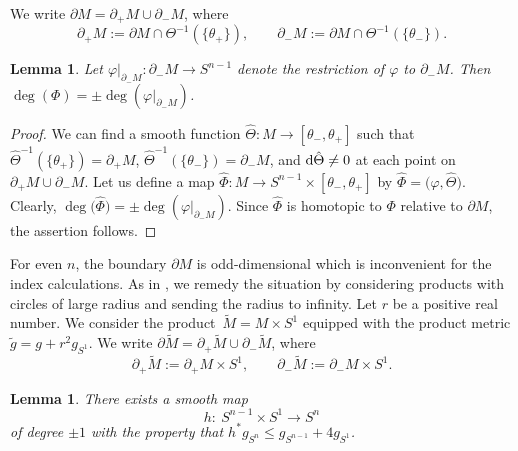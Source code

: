 \documentclass[pdftex]{sigma}
\numberwithin{equation}{section}
\newtheorem{Lemma}[Theorem]{Lemma}
\begin{document}
We write $\partial M = \partial_+ M \cup \partial_- M$, where
\[
\partial_+ M := \partial M \cap \Theta^{-1}(\{\theta_+\}), \qquad \partial_- M := \partial M \cap \Theta^{-1}(\{\theta_-\}).
\]

\begin{Lemma} \label{deg_of_restriction}
Let $\varphi|_{\partial_- M}\colon \partial_- M \to S^{n-1}$ denote the restriction of $\varphi$ to $\partial_- M$.
Then $\deg(\Phi) = \pm \deg(\varphi|_{\partial_- M})$.
\end{Lemma}

\begin{proof}
We can find a smooth function $\hat{\Theta}\colon M \to [\theta_-,\theta_+]$ such that $\hat{\Theta}^{-1}(\{\theta_+\}) = \partial_+ M$, $\hat{\Theta}^{-1}(\{\theta_-\}) = \partial_- M$, and ${\rm d}\hat{\Theta} \neq 0$ at each point on $\partial_+ M \cup \partial_- M$.
Let us define a map $\hat{\Phi}\colon M \to S^{n-1} \times [\theta_-,\theta_+]$ by $\hat{\Phi} = \big(\varphi,\hat{\Theta}\big)$. Clearly, $\deg\big(\hat{\Phi}\big) = \pm \deg(\varphi|_{\partial_- M})$.
Since $\hat{\Phi}$ is homotopic to $\Phi$ relative to $\partial M$, the assertion follows.
\end{proof}

For even $n$, the boundary $\partial M$ is odd-dimensional which is inconvenient for the index calculations.
As in \cite{Llarull}, we remedy the situation by considering products with circles of large radius and sending the radius to infinity.
Let $r$ be a positive real number. We consider the product~${\tilde{M} = M \times S^1}$ equipped with the product metric $\tilde{g} = g + r^2 g_{S^1}$. We write $\partial \tilde{M} = \partial_+ \tilde{M} \cup \partial_- \tilde{M}$, where
\[\partial_+ \tilde{M} := \partial_+ M \times S^1, \qquad \partial_- \tilde{M} := \partial_- M \times S^1.\]

\begin{Lemma} \label{map_to_Sn}
There exists a smooth map
\begin{equation*}
 h\colon\ S^{n-1} \times S^1 \to S^n
\end{equation*}
of degree $\pm 1$ with the property that $h^* g_{S^n} \leq g_{S^{n-1}} + 4 g_{S^1}$.
\end{Lemma}
\end{document}
